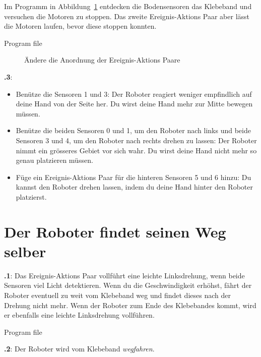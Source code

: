 \documentclass[12pt,a4paper,english]{article}
\begin{document}
Im Programm in Abbildung~\ref{fig.change} entdecken die Bodensensoren das Klebeband und versuchen die Motoren zu stoppen. Das zweite Ereignis-Aktions Paar aber lässt die Motoren laufen, bevor diese stoppen konnten.

{\raggedleft \hfill Program file }

\begin{figure}[hbt]
\begin{center}
\caption{Ändere die Anordnung der Ereignis-Aktions Paare}\label{fig.change}
\end{center}
\end{figure}

\textbf{\thesection.3}: 
\begin{itemize}
\item Benütze die Sensoren 1 und 3: Der Roboter reagiert weniger empfindlich auf deine Hand von der Seite her. Du wirst deine Hand mehr zur Mitte bewegen müssen.
\item Benütze die beiden Sensoren 0 und 1, um den Roboter nach links und beide Sensoren 3 und 4, um den Roboter nach rechts drehen zu lassen: Der Roboter nimmt ein grösseres Gebiet vor sich wahr. Du wirst deine Hand nicht mehr so genau platzieren müssen.

\item Füge ein Ereignis-Aktions Paar für die hinteren Sensoren 5 und 6 hinzu: Du kannst den Roboter drehen lassen, indem du deine Hand hinter den Roboter platzierst.
\end{itemize}


\section{Der Roboter findet seinen Weg selber}


\textbf{\thesection.1}: Das Ereignis-Aktions Paar
vollführt eine leichte Linksdrehung, wenn beide Sensoren viel Licht detektieren. Wenn du die Geschwindigkeit erhöhst, fährt der Roboter eventuell zu weit vom Klebeband weg und findet dieses nach der Drehung nicht mehr. Wenn der Roboter zum Ende des Klebebandes kommt, wird er ebenfalls eine leichte Linksdrehung vollführen.

{\raggedleft \hfill Program file }

\textbf{\thesection.2}: Der Roboter wird vom Klebeband \emph{wegfahren}.
\end{document}
